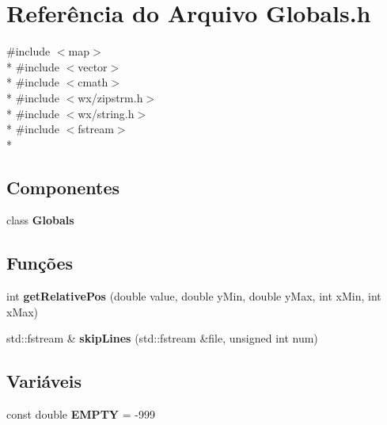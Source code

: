 \section{Referência do Arquivo Globals.\+h}
\label{_globals_8h}
{\ttfamily \#include $<$map$>$}\\*
{\ttfamily \#include $<$vector$>$}\\*
{\ttfamily \#include $<$cmath$>$}\\*
{\ttfamily \#include $<$wx/zipstrm.\+h$>$}\\*
{\ttfamily \#include $<$wx/string.\+h$>$}\\*
{\ttfamily \#include $<$fstream$>$}\\*
\subsection*{Componentes}
\begin{DoxyCompactItemize}
\item 
class {\bf Globals}
\end{DoxyCompactItemize}
\subsection*{Funções}
\begin{DoxyCompactItemize}
\item 
int {\bf get\+Relative\+Pos} (double value, double y\+Min, double y\+Max, int x\+Min, int x\+Max)
\item 
std\+::fstream \& {\bf skip\+Lines} (std\+::fstream \&file, unsigned int num)
\end{DoxyCompactItemize}
\subsection*{Variáveis}
\begin{DoxyCompactItemize}
\item 
const double {\bf E\+M\+P\+TY} = -\/999
\end{DoxyCompactItemize}
